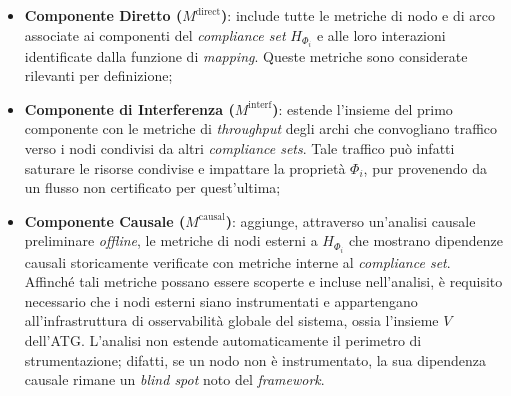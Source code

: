 \begin{itemize}
  \item \textbf{Componente Diretto ($M^{\text{direct}}$)}: include tutte le metriche di nodo e di
        arco associate ai componenti del \textit{compliance set} $H_{\Phi_i}$ e alle loro
        interazioni identificate dalla funzione di \textit{mapping}. Queste metriche sono
        considerate rilevanti per definizione;
  \item \textbf{Componente di Interferenza ($M^{\text{interf}}$)}: estende l'insieme del primo
        componente con le metriche di \textit{throughput} degli archi che convogliano traffico
        verso i nodi condivisi da altri \textit{compliance sets}. Tale traffico può infatti
        saturare le risorse condivise e impattare la proprietà $\Phi_i$, pur provenendo da un
        flusso non certificato per quest'ultima;
  \item \textbf{Componente Causale ($M^{\text{causal}}$)}: aggiunge, attraverso un'analisi causale
        preliminare \textit{offline}, le metriche di nodi esterni a $H_{\Phi_i}$ che mostrano
        dipendenze causali storicamente verificate con metriche interne al \textit{compliance set}.
        Affinché tali metriche possano essere scoperte e incluse nell'analisi, è requisito necessario
        che i nodi esterni siano instrumentati e appartengano all'infrastruttura di osservabilità
        globale del sistema, ossia l'insieme $V$ dell'\gls{ATG}. L'analisi non estende
        automaticamente il perimetro di strumentazione; difatti, se un nodo non è instrumentato,
        la sua dipendenza causale rimane un \textit{blind spot} noto del \textit{framework}.
\end{itemize}

